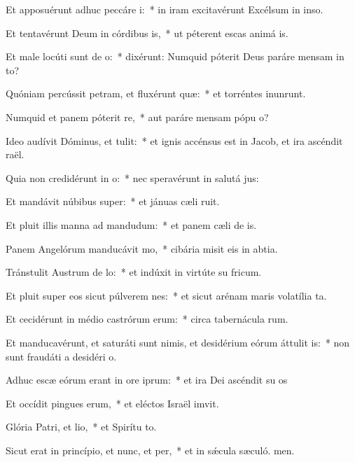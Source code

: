 \item Et apposuérunt adhuc peccáre i:~* in iram excitavérunt Excélsum in inso.
\item Et tentavérunt Deum in córdibus is,~* ut péterent escas animá is.
\item Et male locúti sunt de o:~* dixérunt: Numquid póterit Deus paráre mensam in to?
\item Quóniam percússit petram, et fluxérunt quæ:~* et torréntes inunrunt.
\item Numquid et panem póterit re,~* aut paráre mensam pópu o?
\item Ideo audívit Dóminus, et tulit:~* et ignis accénsus est in Jacob, et ira ascéndit  raël.
\item Quia non credidérunt in o:~* nec speravérunt in salutá jus:
\item Et mandávit núbibus super:~* et jánuas cæli ruit.
\item Et pluit illis manna ad mandudum:~* et panem cæli de is.
\item Panem Angelórum manducávit mo,~* cibária misit eis in abtia.
\item Tránstulit Austrum de lo:~* et indúxit in virtúte su fricum.
\item Et pluit super eos sicut púlverem nes:~* et sicut arénam maris volatília ta.
\item Et cecidérunt in médio castrórum erum:~* circa tabernácula rum.
\item Et manducavérunt, et saturáti sunt nimis, et desidérium eórum áttulit is:~* non sunt fraudáti a desidéri o.
\item Adhuc escæ eórum erant in ore iprum:~* et ira Dei ascéndit su os
\item Et occídit pingues erum,~* et eléctos Israël imvit.
\item Glória Patri, et lio,~* et Spirítu to.
\item Sicut erat in princípio, et nunc, et per,~* et in sǽcula sæculó. men.
